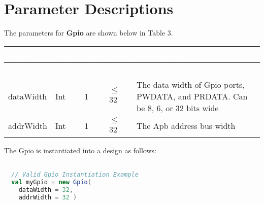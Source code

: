 
\section{Parameter Descriptions}

The parameters for \textbf{Gpio} are shown below in
Table 3.

\renewcommand*{\arraystretch}{1.4}
\begingroup
\small
{} %
\begin{longtable}[H]{
    | p{}
    | p{}
    | p{}
    | p{}
    | p{} |
  }
  \hline
  \rowcolor{dark-gray}

  \textcolor{white}{\textbf{Name}} &
  \textcolor{white}{\textbf{Type}} &
  \textcolor{white}{\textbf{Min}} &
  \textcolor{white}{\textbf{Max}} &
  \textcolor{white}{\textbf{Description}} \\ \hline
  \endfirsthead

  \textcolor{white}{\textbf{Name}} &
  \textcolor{white}{\textbf{Type}} &
  \textcolor{white}{\textbf{Min}} &
  \textcolor{white}{\textbf{Max}} &
  \textcolor{white}{\textbf{Description}}            \\ \hline
  \endhead


  \endfoot

  dataWidth   &
  Int       &
  1         &
  $\leq$ 32          &
  The data width of Gpio ports, PWDATA, and PRDATA. Can be 8, 6, or 32 bits wide \\ \hline

  addrWidth     &
  Int           &
  1             &
  $\leq$ 32       &
  The Apb address bus width  \\ \hline

\end{longtable}
\captionsetup{aboveskip=0pt}
\label{table:params}
\endgroup

The Gpio is instantiated into a design as follows:

\begin{lstlisting}[language=Scala]

  // Valid Gpio Instantiation Example
  val myGpio = new Gpio(
    dataWidth = 32, 
    addrWidth = 32 ) 

  \end{lstlisting}

